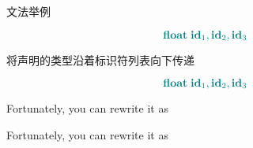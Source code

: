 
\begin{frame}{}
  \begin{center}
    文法举例

    \[
      \textcolor{teal}{\text{\bf float}\; \text{\bf id}_{1}, \text{\bf id}_{2}, \text{\bf id}_{3}}
    \]
  \end{center}
\end{frame}

\begin{frame}{}
  \begin{center}
     将声明的类型沿着标识符列表向下传递

    \[
        \textcolor{teal}{\text{\bf float}\; \text{\bf id}_{1}, \text{\bf id}_{2}, \text{\bf id}_{3}}
    \]
  \end{center}
\end{frame}

\begin{frame}{}

  \pause
  \begin{center}
    Fortunately, you can rewrite it as 
  \end{center}
\end{frame}

\begin{frame}{}
  \begin{center}
    Fortunately, you can rewrite it as 

    \vspace{0.80cm}
  \end{center}
\end{frame}



